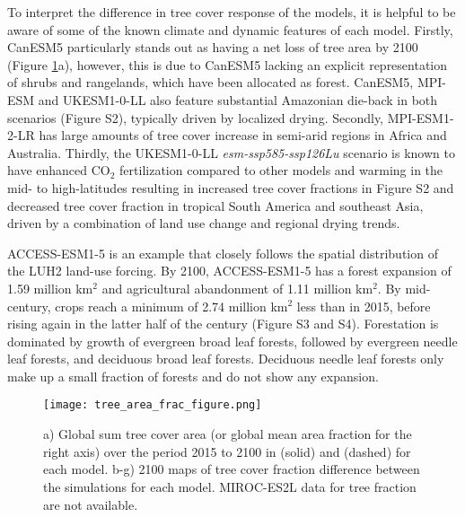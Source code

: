 \documentclass[draft]{agujournal2019}
\begin{document}
To interpret the difference in tree cover response of the models, it is helpful to be aware of some of the known climate and dynamic features of each model.
Firstly, CanESM5 particularly stands out as having a net loss of tree area by 2100 (Figure \ref{fig:land_use_map}a), however, this is due to CanESM5 lacking an explicit representation of shrubs and rangelands, which have been allocated as forest.
 CanESM5, MPI-ESM and UKESM1-0-LL also feature substantial Amazonian die-back in both scenarios (Figure S2), typically driven by localized drying.
Secondly, MPI-ESM1-2-LR has large amounts of tree cover increase in semi-arid regions in Africa and Australia.
Thirdly, the UKESM1-0-LL \textit{esm-ssp585-ssp126Lu} scenario is known to have enhanced CO$_2$ fertilization compared to other models and warming in the mid- to high-latitudes resulting in increased tree cover fractions in Figure S2 and decreased tree cover fraction in tropical South America and southeast Asia, driven by a combination of land use change and regional drying trends.



ACCESS-ESM1-5 is an example that closely follows the spatial distribution of the LUH2 land-use forcing.
By 2100, ACCESS-ESM1-5 has a forest expansion of 1.59 million km$^2$ and agricultural abandonment of 1.11 million km$^2$.
By mid-century, crops reach a minimum of 2.74 million km$^2$ less than in 2015, before rising again in the latter half of the century (Figure S3 and S4).
Forestation is dominated by growth of evergreen broad leaf forests, followed by evergreen needle leaf forests, and deciduous broad leaf forests.
Deciduous needle leaf forests only make up a small fraction of forests and do not show any expansion.

\begin{figure}
    \texttt{[image: tree\_area\_frac\_figure.png]}
    \caption{a) Global sum tree cover area (or global mean area fraction for the right axis) over the period 2015 to 2100 in  (solid) and  (dashed) for each model. b-g) 2100 maps of tree cover fraction difference between the simulations for each model. MIROC-ES2L data for tree fraction are not available.}
    \label{fig:land_use_map}
\end{figure}
\end{document}
